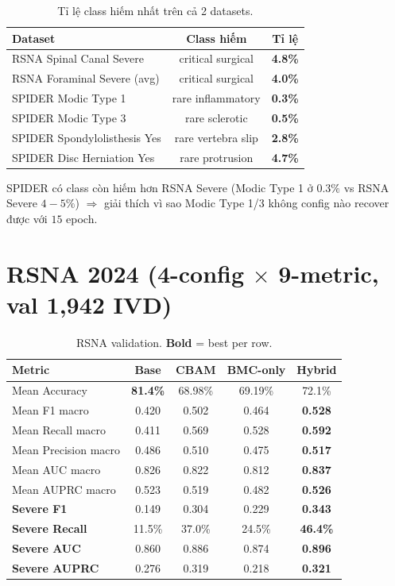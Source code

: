 \documentclass[11pt,a4paper]{article}
\newcommand{\best}[1]{\textbf{#1}}
\begin{document}
\begin{table}[h]
\centering
\caption{Tỉ lệ class hiếm nhất trên cả 2 datasets.}
\small
\begin{tabular}{lcc}
\toprule
\rowcolor{tablehdr}
Dataset & Class hiếm & Tỉ lệ \\
\midrule
RSNA Spinal Canal Severe       & critical surgical & \textbf{4.8\%} \\
RSNA Foraminal Severe (avg)    & critical surgical & \textbf{4.0\%} \\
SPIDER Modic Type 1            & rare inflammatory & \textbf{0.3\%} \\
SPIDER Modic Type 3            & rare sclerotic    & \textbf{0.5\%} \\
SPIDER Spondylolisthesis Yes   & rare vertebra slip & \textbf{2.8\%} \\
SPIDER Disc Herniation Yes     & rare protrusion   & \textbf{4.7\%} \\
\bottomrule
\end{tabular}
\end{table}

\noindent SPIDER có class còn hiếm hơn RSNA Severe (Modic Type 1 ở
$0.3\%$ vs RSNA Severe $4-5\%$) $\Rightarrow$ giải thích vì sao
Modic Type 1/3 không config nào recover được với $15$ epoch.

\section{RSNA 2024 (4-config $\times$ 9-metric, val 1{,}942 IVD)}

\begin{table}[h]
\centering
\caption{RSNA validation. \best{Bold} = best per row.}
\begin{tabular}{@{}lcccc@{}}
\toprule
\rowcolor{tablehdr}
Metric & Base & CBAM & BMC-only & \best{Hybrid} \\
\midrule
Mean Accuracy        & \best{81.4\%} & 68.98\% & 69.19\% & 72.1\% \\
Mean F1 macro        & 0.420 & 0.502 & 0.464 & \best{0.528} \\
Mean Recall macro    & 0.411 & 0.569 & 0.528 & \best{0.592} \\
Mean Precision macro & 0.486 & 0.510 & 0.475 & \best{0.517} \\
Mean AUC macro       & 0.826 & 0.822 & 0.812 & \best{0.837} \\
Mean AUPRC macro     & 0.523 & 0.519 & 0.482 & \best{0.526} \\
\midrule
\textbf{Severe F1}    & 0.149 & 0.304 & 0.229 & \best{0.343} \\
\textbf{Severe Recall}& 11.5\%& 37.0\%& 24.5\%& \best{46.4\%} \\
\textbf{Severe AUC}   & 0.860 & 0.886 & 0.874 & \best{0.896} \\
\textbf{Severe AUPRC} & 0.276 & 0.319 & 0.218 & \best{0.321} \\
\bottomrule
\end{tabular}
\end{table}
\end{document}
